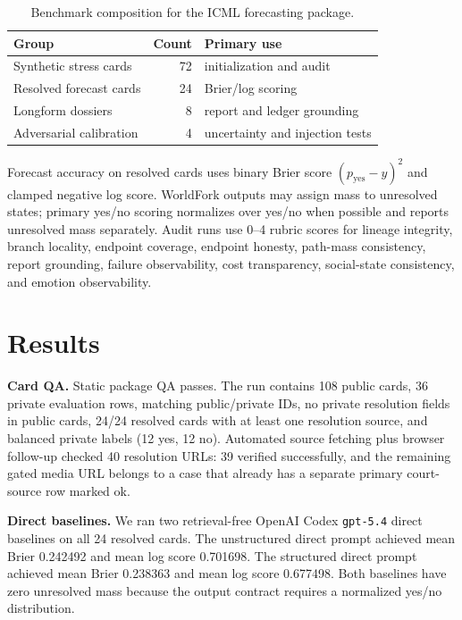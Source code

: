 \documentclass{article}
\begin{document}
\begin{table}[t]
\centering
\footnotesize
\begin{tabular}{p{}rp{}}
\toprule
Group & Count & Primary use \\
\midrule
Synthetic stress cards & 72 & initialization and audit \\
Resolved forecast cards & 24 & Brier/log scoring \\
Longform dossiers & 8 & report and ledger grounding \\
Adversarial calibration & 4 & uncertainty and injection tests \\
\bottomrule
\end{tabular}
\caption{Benchmark composition for the ICML forecasting package.}
\label{tab:composition}
\end{table}

Forecast accuracy on resolved cards uses binary Brier score $(p_{\mathrm{yes}}-y)^2$ and clamped negative log score. WorldFork outputs may assign mass to unresolved states; primary yes/no scoring normalizes over yes/no when possible and reports unresolved mass separately. Audit runs use 0--4 rubric scores for lineage integrity, branch locality, endpoint coverage, endpoint honesty, path-mass consistency, report grounding, failure observability, cost transparency, social-state consistency, and emotion observability.

\section{Results}

\textbf{Card QA.} Static package QA passes. The run contains 108 public cards, 36 private evaluation rows, matching public/private IDs, no private resolution fields in public cards, 24/24 resolved cards with at least one resolution source, and balanced private labels (12 yes, 12 no). Automated source fetching plus browser follow-up checked 40 resolution URLs: 39 verified successfully, and the remaining gated media URL belongs to a case that already has a separate primary court-source row marked ok.

\textbf{Direct baselines.} We ran two retrieval-free OpenAI Codex \texttt{gpt-5.4} direct baselines on all 24 resolved cards. The unstructured direct prompt achieved mean Brier 0.242492 and mean log score 0.701698. The structured direct prompt achieved mean Brier 0.238363 and mean log score 0.677498. Both baselines have zero unresolved mass because the output contract requires a normalized yes/no distribution.
\end{document}
